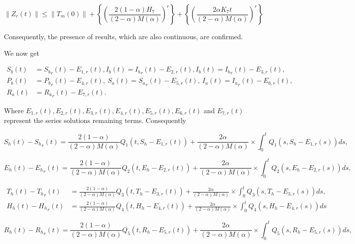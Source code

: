 \documentclass[10pt]{NSP1}
\begin{document}
{\small
\begin{equation}
\| Z_{r}(t)\| \leq \| T_{m}(0)\| + \left\{ \left( \frac{2(1 - \alpha)H_{7}}{(2 - \alpha)M(\alpha)} \right)^{r} \right\} + \left\{ \left( \frac{2\alpha K_{7}t}{(2 - \alpha)M(\alpha)} \right)^{r} \right\}
\end{equation}
}

Consequently, the presence of results, which are also continuous, are confirmed.

We now get

\begin{equation}
\begin{aligned}
S_{b}(t) &= {S_{b}}_{r}(t) - E_{1,r}(t),I_{b}(t) = {I_{b}}_{r}(t) - E_{2,r}(t),I_{b}(t) = {I_{b}}_{r}(t) - E_{3,r}(t), \\
P_{b}(t) &= {P_{b}}_{r}(t) - E_{4,r}(t),\ S_{a}(t) = {S_{a}}_{r}(t) - E_{5,r}(t),\ I_{a}(t) = {I_{a}}_{r}(t) - E_{6,r}(t), \\
R_{a}(t) &= {R_{a}}_{r}(t) - E_{7,r}(t).
\end{aligned}
\end{equation}

Where \(E_{1,r}(t),E_{2,r}(t),E_{3,r}(t),E_{4,r}(t),E_{5,r}(t),E_{6,r}(t)\) and \(E_{7,r}(t)\) represent the series solution\textquotesingle s remaining terms. Consequently

\[
S_{h}(t) - {S_{h}}_{r}(t) = \frac{2(1 - \alpha)}{(2 - \alpha)M(\alpha)}Q_{1}\left( t,S_{h} - E_{1,r}(t) \right) + \frac{2\alpha}{(2 - \alpha)M(\alpha)} \times \int_{0}^{t}{}Q_{1}\left( s,S_{h} - E_{1,r}(s) \right)ds,
\]

\[
E_{h}(t) - {E_{h}}_{r}(t) = \frac{2(1 - \alpha)}{(2 - \alpha)M(\alpha)}Q_{2}\left( t,E_{h} - E_{2,r}(t) \right) + \frac{2\alpha}{(2 - \alpha)M(\alpha)} \times \int_{0}^{t}{}Q_{2}\left( s,E_{h} - E_{2,r}(s) \right)ds,
\]

\[
\begin{aligned}
T_{h}(t) - {T_{h}}_{r}(t) &= \frac{2(1 - \alpha)}{(2 - \alpha)M(\alpha)}Q_{3}\left( t,T_{h} - E_{3,r}(t) \right) + \frac{2\alpha}{(2 - \alpha)M(\alpha)} \times \int_{0}^{t}{}Q_{3}\left( s,T_{h} - E_{3,r}(s) \right)ds, \\
H_{h}(t) - {H_{h}}_{r}(t) &= \frac{2(1 - \alpha)}{(2 - \alpha)M(\alpha)}Q_{4}\left( t,H_{h} - E_{4,r}(t) \right) + \frac{2\alpha}{(2 - \alpha)M(\alpha)} \times \int_{0}^{t}{}Q_{4}\left( s,H_{h} - E_{4,r}(s) \right)ds
\end{aligned}
\]

\[
R_{h}(t) - {R_{h}}_{r}(t) = \frac{2(1 - \alpha)}{(2 - \alpha)M(\alpha)}Q_{5}\left( t,R_{h} - E_{5,r}(t) \right) + \frac{2\alpha}{(2 - \alpha)M(\alpha)} \times \int_{0}^{t}{}Q_{5}\left( s,R_{h} - E_{5,r}(s) \right)ds,
\]
\end{document}
